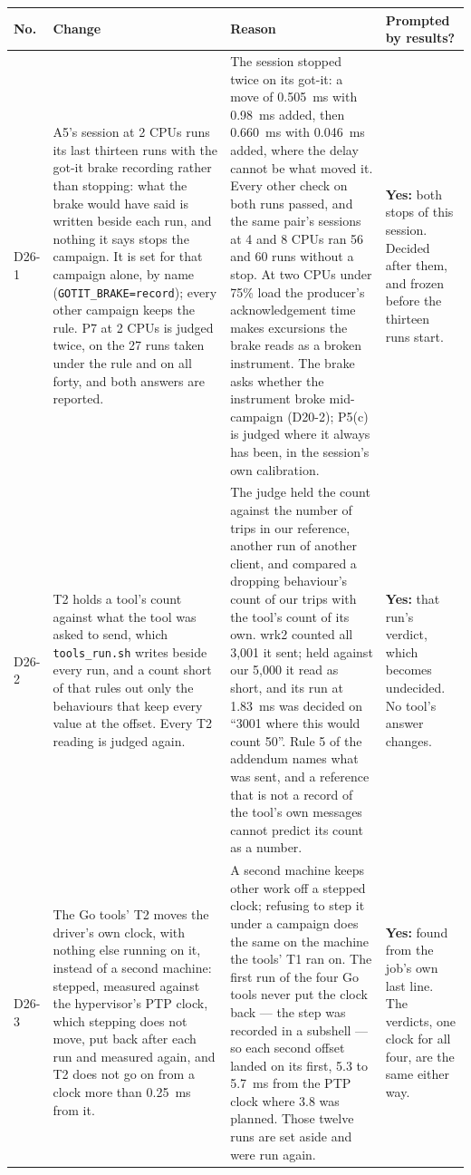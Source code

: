 \documentclass[11pt]{article}
\begin{document}
{\small
\begin{longtable}{@{}p{1.1cm} >{\raggedright\arraybackslash}p{6.1cm} >{\raggedright\arraybackslash}p{6.0cm} >{\raggedright\arraybackslash}p{2.2cm}@{}}
\toprule
\textbf{No.} & \textbf{Change} & \textbf{Reason} & \textbf{Prompted by results?} \\
\midrule
\endhead
D26-1 & A5's session at 2 CPUs runs its last thirteen runs with the got-it brake recording rather than stopping: what the brake would have said is written beside each run, and nothing it says stops the campaign. It is set for that campaign alone, by name (\texttt{GOTIT\_BRAKE=record}); every other campaign keeps the rule. P7 at 2 CPUs is judged twice, on the 27 runs taken under the rule and on all forty, and both answers are reported. & The session stopped twice on its got-it: a move of 0.505~ms with 0.98~ms added, then 0.660~ms with 0.046~ms added, where the delay cannot be what moved it. Every other check on both runs passed, and the same pair's sessions at 4 and 8 CPUs ran 56 and 60 runs without a stop. At two CPUs under 75\% load the producer's acknowledgement time makes excursions the brake reads as a broken instrument. The brake asks whether the instrument broke mid-campaign (D20-2); P5(c) is judged where it always has been, in the session's own calibration. & \textbf{Yes:} both stops of this session. Decided after them, and frozen before the thirteen runs start. \\
D26-2 & T2 holds a tool's count against what the tool was asked to send, which \texttt{tools\_run.sh} writes beside every run, and a count short of that rules out only the behaviours that keep every value at the offset. Every T2 reading is judged again. & The judge held the count against the number of trips in our reference, another run of another client, and compared a dropping behaviour's count of our trips with the tool's count of its own. wrk2 counted all 3,001 it sent; held against our 5,000 it read as short, and its run at 1.83~ms was decided on ``3001 where this would count 50''. Rule 5 of the addendum names what was sent, and a reference that is not a record of the tool's own messages cannot predict its count as a number. & \textbf{Yes:} that run's verdict, which becomes undecided. No tool's answer changes. \\
D26-3 & The Go tools' T2 moves the driver's own clock, with nothing else running on it, instead of a second machine: stepped, measured against the hypervisor's PTP clock, which stepping does not move, put back after each run and measured again, and T2 does not go on from a clock more than 0.25~ms from it. & A second machine keeps other work off a stepped clock; refusing to step it under a campaign does the same on the machine the tools' T1 ran on. The first run of the four Go tools never put the clock back --- the step was recorded in a subshell --- so each second offset landed on its first, 5.3 to 5.7~ms from the PTP clock where 3.8 was planned. Those twelve runs are set aside and were run again. & \textbf{Yes:} found from the job's own last line. The verdicts, one clock for all four, are the same either way. \\

\end{longtable}}
\end{document}
